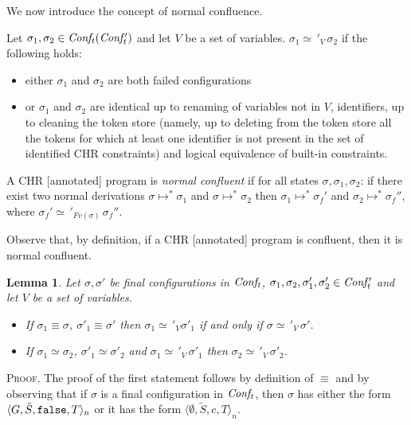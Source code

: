 \documentclass[final]{acmtrans2e}
\newtheorem{lemma}[theorem]{Lemma}
\begin{document}
We now introduce the concept of normal confluence.


\begin{definition}
Let
$\sigma_1, \sigma_2 \in {\it Conf_t} ({\it Conf'_t})$ and let $V$ be a set of variables. $\sigma_1\simeq\,'_{V}\,\sigma_2$ if the following holds:
\begin{itemize}
  \item either $\sigma_1$ and $\sigma_2$ are both failed configurations
  \item or $\sigma_1$ and $\sigma_2$ are identical up to renaming of variables not in $V$,
identifiers, up to cleaning the token store (namely, up to deleting from the token store all the tokens for
which at least one identifier is not present in the set of
identified CHR constraints) and logical equivalence of built-in constraints.
\end{itemize}
\end{definition}




\begin{definition}
A CHR [annotated] program is \emph{normal confluent} if for all states
$\sigma, \sigma_1, \sigma_2$:
if there exist two normal derivations $\sigma\mapsto^{*} \sigma_1$ and $\sigma\mapsto^{*} \sigma_2$ then $\sigma_1 \mapsto^{*}\sigma_f'$ and $\sigma_2\mapsto^{*}\sigma_f''$, where $\sigma_f'\simeq\,'_{Fv(\sigma)}\,\sigma_f''$.
\end{definition}


Observe that, by definition, if a CHR [annotated] program is confluent, then it is normal confluent.


\begin{lemma}\label{relrel}
Let $\sigma, \sigma'$ be final configurations in ${\it Conf_t}$, $\sigma_1, \sigma_2, \sigma'_1, \sigma'_2 \in {\it Conf'_t}$ and let $V$ be a set of variables.
\begin{itemize}
  \item If $\sigma_1\equiv \sigma$, $\sigma'_1\equiv \sigma'$ then  $\sigma_1\simeq\,'_{V}\sigma'_1$ if and only if $\sigma\simeq\,'_{V}\,\sigma'$.
  \item If $\sigma_1\simeq \sigma_2$, $\sigma'_1\simeq \sigma'_2$ and  $\sigma_1\simeq\,'_{V}\,\sigma'_1$ then $\sigma_2\simeq\,'_{V}\,\sigma'_2$.
\end{itemize}
\end{lemma}
\textsc{Proof.}
The proof of the first statement follows by definition of $\equiv$ and by observing that if $\sigma$ is a final configuration in ${\it Conf_t}$, then $\sigma$
has either the form $\langle  G,
\tilde S, {\tt false} , T\rangle_n$  or it
has the form $\langle \emptyset,\tilde S, c,T \rangle_n$.
\end{document}
